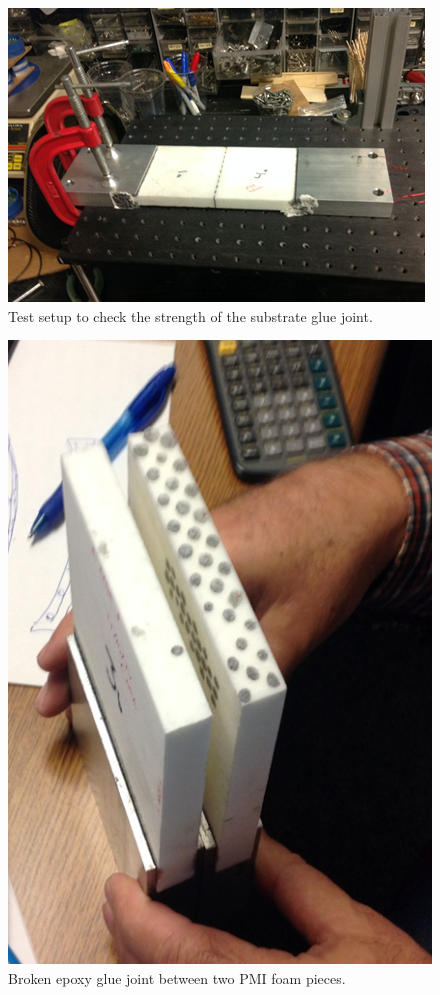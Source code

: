 \begin{figure}[ht]
    \centering
    \includegraphics[width=0.95\linewidth]{images/Glue_joint_test.png}
    \caption{Test setup to check the strength of the substrate glue joint.}
    \label{fig:Glue_joint_test}
\end{figure}


\begin{figure}[ht]
    \centering
    \includegraphics[width=1.0\linewidth]{images/Broken.png}
    \caption{Broken epoxy glue joint between two PMI foam pieces.}
    \label{fig:Broken}
\end{figure}

